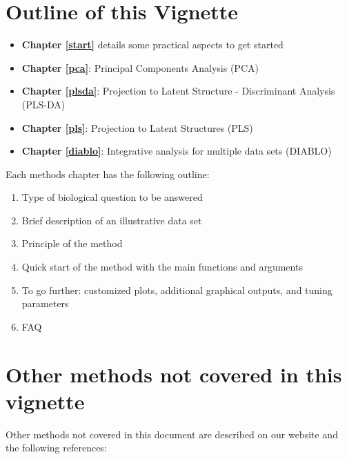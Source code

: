 \documentclass[]{book}
\providecommand{\tightlist}{%
  \setlength{\itemsep}{0pt}\setlength{\parskip}{0pt}}
\begin{document}
\hypertarget{outline-of-this-vignette}{%
\section{Outline of this Vignette}\label{outline-of-this-vignette}}

\begin{itemize}
\tightlist
\item
  \textbf{Chapter \ref{start}} details some practical aspects to get started
\item
  \textbf{Chapter \ref{pca}}: Principal Components Analysis (PCA)
\item
  \textbf{Chapter \ref{plsda}}: Projection to Latent Structure - Discriminant Analysis (PLS-DA)
\item
  \textbf{Chapter \ref{pls}}: Projection to Latent Structures (PLS)
\item
  \textbf{Chapter \ref{diablo}}: Integrative analysis for multiple data sets (DIABLO)
\end{itemize}

Each methods chapter has the following outline:

\begin{enumerate}
\def\labelenumi{\arabic{enumi}.}
\tightlist
\item
  Type of biological question to be answered
\item
  Brief description of an illustrative data set
\item
  Principle of the method
\item
  Quick start of the method with the main functions and arguments
\item
  To go further: customized plots, additional graphical outputs, and tuning parameters
\item
  FAQ
\end{enumerate}

\hypertarget{other-methods-not-covered-in-this-vignette}{%
\section{Other methods not covered in this vignette}\label{other-methods-not-covered-in-this-vignette}}

Other methods not covered in this document are described on our website and the following references:
\end{document}
